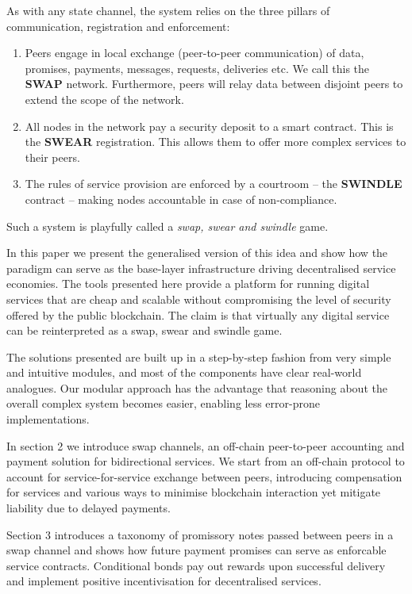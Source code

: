 As with any state channel, the system relies on the three pillars of communication, registration and enforcement:
\begin{enumerate}
 \item Peers engage in local exchange (peer-to-peer communication) of data, promises, payments, messages, requests, deliveries etc. We call this the \textbf{SWAP} network. Furthermore, peers will relay data between disjoint peers to extend the scope of the network.
 \item All nodes in the network pay a security deposit to a smart contract. This is the \textbf{SWEAR} registration. This allows them to offer more complex services to their peers.
 \item The rules of service provision are enforced by a courtroom -- the \textbf{SWINDLE} contract -- making nodes accountable in case of non-compliance.
\end{enumerate}

Such a system is playfully called a \emph{swap, swear and swindle} game.

In this paper we present the generalised version of this idea and show how the paradigm can serve as the base-layer infrastructure driving decentralised service economies.
The tools presented here provide a platform for running digital services that are cheap and scalable without compromising the level of security offered by the public blockchain.
The claim is that virtually any digital service can be reinterpreted as a swap, swear and swindle game.

The solutions presented are built up in a step-by-step fashion from very simple and intuitive
modules, %
and most of the components have clear real-world analogues. Our modular approach has the advantage that reasoning about the overall complex system becomes easier, enabling less error-prone implementations.

In section 2 we introduce swap channels, an off-chain peer-to-peer accounting and
payment solution for bidirectional services. We start from an off-chain protocol to
account for service-for-service exchange between peers, introducing compensation for services
and various ways to minimise blockchain interaction yet mitigate liability due to delayed payments.

Section 3 introduces a taxonomy of promissory notes passed between peers in a swap channel and shows how future payment promises can serve as enforcable service contracts.
Conditional bonds pay out rewards upon successful delivery and
implement positive incentivisation for decentralised services.

